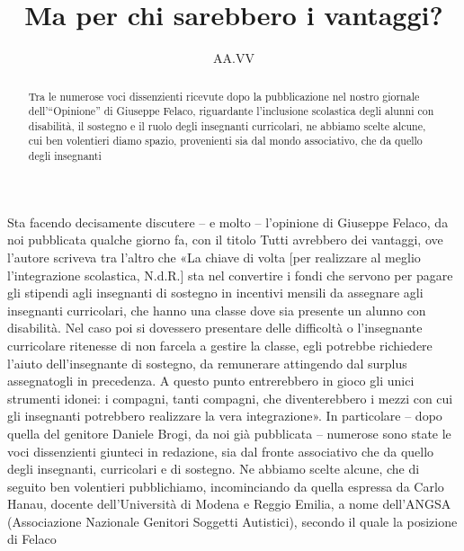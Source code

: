 \author{AA.VV}
\title{Ma per chi sarebbero i vantaggi?}
\label{cha:direttore290413}
\begin{abstract}
Tra le numerose voci dissenzienti ricevute dopo la pubblicazione nel nostro giornale dell’“Opinione” di Giuseppe Felaco, riguardante l’inclusione scolastica degli alunni con disabilità, il sostegno e il ruolo degli insegnanti curricolari, ne abbiamo scelte alcune, cui ben volentieri diamo spazio, provenienti sia dal mondo associativo, che da quello degli insegnanti
\end{abstract}
\maketitle
{}
Sta facendo decisamente discutere – e molto – l'opinione di Giuseppe Felaco, da noi pubblicata qualche giorno fa, con il titolo Tutti avrebbero dei vantaggi\pageref{felaco260413}, ove l'autore scriveva tra l'altro che «La chiave di volta [per realizzare al meglio l'integrazione scolastica, N.d.R.] sta nel convertire i fondi che servono per pagare gli stipendi agli insegnanti di sostegno in incentivi mensili da assegnare agli insegnanti curricolari, che hanno una classe dove sia presente un alunno con disabilità. Nel caso poi si dovessero presentare delle difficoltà o l'insegnante curricolare ritenesse di non farcela a gestire la classe, egli potrebbe richiedere l'aiuto dell'insegnante di sostegno, da remunerare attingendo dal surplus assegnatogli in precedenza. A questo punto entrerebbero in gioco gli unici strumenti idonei: i compagni, tanti compagni, che diventerebbero i mezzi con cui gli insegnanti potrebbero realizzare la vera integrazione».
In particolare – dopo quella del genitore Daniele Brogi, da noi già pubblicata\pageref{brogi260413} – numerose sono state le voci dissenzienti giunteci in redazione, sia dal fronte associativo che da quello degli insegnanti, curricolari e di sostegno.
Ne abbiamo scelte alcune, che di seguito ben volentieri pubblichiamo, incominciando da quella espressa da Carlo Hanau, docente dell'Università di Modena e Reggio Emilia, a nome dell'ANGSA (Associazione Nazionale Genitori Soggetti Autistici), secondo il quale la posizione di Felaco  

